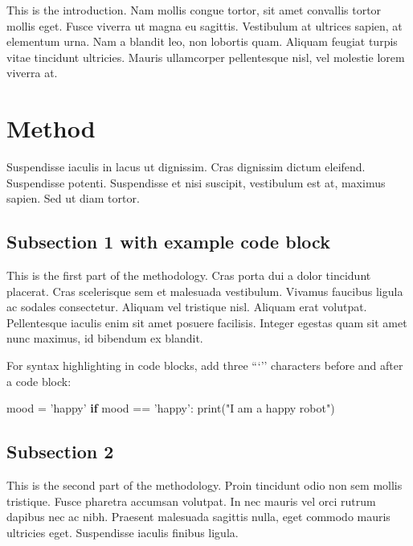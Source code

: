 \documentclass[12pt,a4paper,]{report}
\newenvironment{Shaded}{}{}
\newcommand{\StringTok}[1]{\textcolor[rgb]{0.25,0.44,0.63}{{#1}}}
\newcommand{\ControlFlowTok}[1]{\textcolor[rgb]{0.00,0.44,0.13}{\textbf{{#1}}}}
\newcommand{\OperatorTok}[1]{\textcolor[rgb]{0.40,0.40,0.40}{{#1}}}
\newcommand{\BuiltInTok}[1]{{#1}}
\newcommand{\NormalTok}[1]{{#1}}
\begin{document}
This is the introduction. Nam mollis congue tortor, sit amet convallis
tortor mollis eget. Fusce viverra ut magna eu sagittis. Vestibulum at
ultrices sapien, at elementum urna. Nam a blandit leo, non lobortis
quam. Aliquam feugiat turpis vitae tincidunt ultricies. Mauris
ullamcorper pellentesque nisl, vel molestie lorem viverra at.

\section{Method}\label{method}

Suspendisse iaculis in lacus ut dignissim. Cras dignissim dictum
eleifend. Suspendisse potenti. Suspendisse et nisi suscipit, vestibulum
est at, maximus sapien. Sed ut diam tortor.

\subsection{Subsection 1 with example code
block}\label{subsection-1-with-example-code-block}

This is the first part of the methodology. Cras porta dui a dolor
tincidunt placerat. Cras scelerisque sem et malesuada vestibulum.
Vivamus faucibus ligula ac sodales consectetur. Aliquam vel tristique
nisl. Aliquam erat volutpat. Pellentesque iaculis enim sit amet posuere
facilisis. Integer egestas quam sit amet nunc maximus, id bibendum ex
blandit.

For syntax highlighting in code blocks, add three ```'' characters
before and after a code block:

\begin{Shaded}
\begin{Highlighting}[]
\NormalTok{mood }\OperatorTok{=} \StringTok{'happy'}
\ControlFlowTok{if} \NormalTok{mood }\OperatorTok{==} \StringTok{'happy'}\NormalTok{:}
    \BuiltInTok{print}\NormalTok{(}\StringTok{"I am a happy robot"}\NormalTok{)}
\end{Highlighting}
\end{Shaded}

\subsection{Subsection 2}\label{subsection-2}

This is the second part of the methodology. Proin tincidunt odio non sem
mollis tristique. Fusce pharetra accumsan volutpat. In nec mauris vel
orci rutrum dapibus nec ac nibh. Praesent malesuada sagittis nulla, eget
commodo mauris ultricies eget. Suspendisse iaculis finibus ligula.
\end{document}

